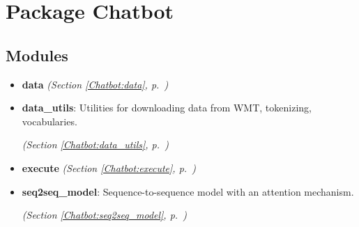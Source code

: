 %
%
%


\section{Package Chatbot}

    \label{Chatbot}


\subsection{Modules}

\begin{itemize}
\setlength{\parskip}{0ex}
\item \textbf{data}
  \textit{(Section \ref{Chatbot:data}, p.~\pageref{Chatbot:data})}

\item \textbf{data\_utils}: Utilities for downloading data from WMT, tokenizing, vocabularies.



  \textit{(Section \ref{Chatbot:data_utils}, p.~\pageref{Chatbot:data_utils})}

\item \textbf{execute}
  \textit{(Section \ref{Chatbot:execute}, p.~\pageref{Chatbot:execute})}

\item \textbf{seq2seq\_model}: Sequence-to-sequence model with an attention mechanism.



  \textit{(Section \ref{Chatbot:seq2seq_model}, p.~\pageref{Chatbot:seq2seq_model})}

\end{itemize}



